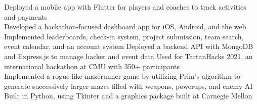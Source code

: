 \documentclass[]{paws}
\begin{document}
{    {Deployed a mobile app with Flutter for players and coaches to track activities and payments}
    \, \\
    {Developed a hackathon-focused dashboard app for iOS, Android, and the web}
    {Implemented leaderboards, check-in system, project submission, team search, event calendar, and an account system}
    {Deployed a backend API with MongoDB and Express.js to manage hacker and event data}
    {Used for TartanHacks 2021, an international hackathon at CMU with 350+ participants}
    \, \\
    {Implemented a rogue-like mazerunner game by utilizing Prim's algorithm to generate successively larger mazes filled with weapons, powerups, and enemy AI}
    {Built in Python, using Tkinter and a graphics package built at Carnegie Mellon}

    \, \\ \\ \\

}
\end{document}
